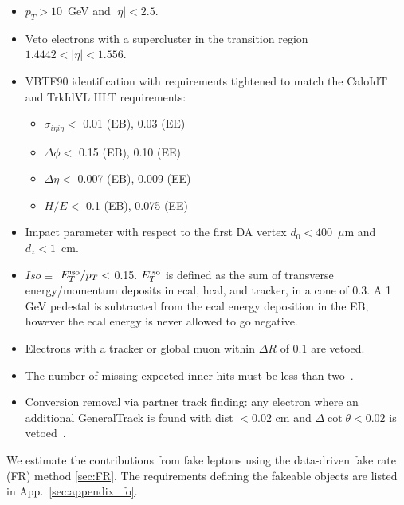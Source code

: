 \begin{itemize}

\item $p_{T}>10$~GeV and $|\eta| < 2.5$.

\item Veto electrons with a supercluster in the transition region $1.4442 < |\eta| < 1.556$.

\item VBTF90 identification\cite{ref:vbtf} with requirements tightened to match the CaloIdT and TrkIdVL HLT requirements:

  \begin{itemize}
  \item $\sigma_{i\eta i\eta} < $ 0.01 (EB), 0.03 (EE)
  \item $\Delta\phi < $ 0.15 (EB), 0.10 (EE)
  \item $\Delta\eta < $ 0.007 (EB), 0.009 (EE)
  \item $H/E < $ 0.1 (EB), 0.075 (EE)
  \end{itemize}  

\item Impact parameter with respect to the first DA vertex $d_0 < 400$~$\mu$m and $d_z < 1$~cm.

\item $Iso \equiv $ $E_T^{\rm iso}/p_T < $ 0.15.  $E_T^{\rm iso}$
is defined as the sum of transverse energy/momentum deposits in ecal,
hcal, and tracker, in a 
cone of 0.3.  A 1 GeV pedestal is subtracted from the ecal energy 
deposition in the EB, however the ecal energy is never allowed to 
go negative.

\item Electrons with a tracker or global muon within $\Delta R$ of 
0.1 are vetoed.

\item The number of missing expected inner hits must be less than 
two~\cite{ref:conv}.

\item Conversion removal via partner track finding: any electron
where an additional GeneralTrack is found with dist $< 0.02$ cm 
and $\Delta\cot\theta < 0.02$ is vetoed~\cite{ref:conv}.


\end{itemize}

We estimate the contributions from fake leptons using the data-driven
fake rate (FR) method \ref{sec:FR}. The requirements defining the fakeable objects 
are listed in App.~\ref{sec:appendix_fo}.


